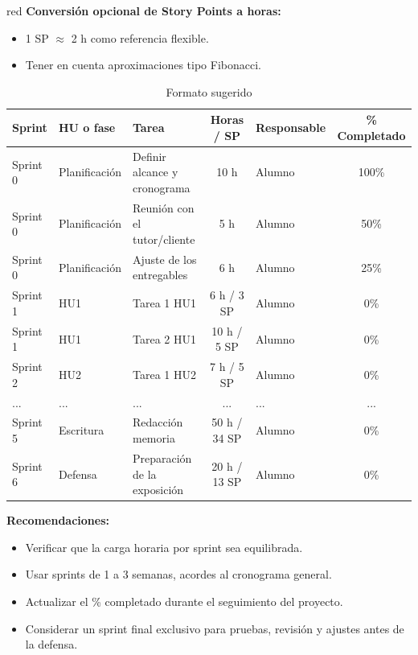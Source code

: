 \begin{consigna}{red}
\textbf{Conversión opcional de Story Points a horas:}
\begin{itemize}
  \item 1 SP \(\approx\) 2 h como referencia flexible.
  \item Tener en cuenta aproximaciones tipo Fibonacci.
\end{itemize}

\begin{table}[htpb]
\centering
\caption{Formato sugerido}
\begin{tabularx}{\linewidth}{@{}|l|l|X|c|l|c|@{}}
\hline
\rowcolor[HTML]{C0C0C0}
Sprint & HU o fase & Tarea & Horas / SP & Responsable & \% Completado \\ \hline
Sprint 0 & Planificación & Definir alcance y cronograma & 10 h & Alumno & 100\% \\ \hline
Sprint 0 & Planificación & Reunión con el tutor/cliente & 5 h & Alumno & 50\% \\ \hline
Sprint 0 & Planificación & Ajuste de los entregables & 6 h & Alumno & 25\% \\ \hline
Sprint 1 & HU1 & Tarea 1 HU1 & 6 h / 3 SP & Alumno & 0\% \\ \hline
Sprint 1 & HU1 & Tarea 2 HU1 & 10 h / 5 SP & Alumno & 0\% \\ \hline
Sprint 2 & HU2 & Tarea 1 HU2 & 7 h / 5 SP & Alumno & 0\% \\ \hline
... & ... & ... & ... & ... & ... \\ \hline
Sprint 5 & Escritura & Redacción memoria & 50 h / 34 SP & Alumno & 0\% \\ \hline
Sprint 6 & Defensa & Preparación de la exposición & 20 h / 13 SP & Alumno & 0\% \\ \hline
\end{tabularx}
\end{table}

\textbf{Recomendaciones:}
\begin{itemize}
  \item Verificar que la carga horaria por sprint sea equilibrada.
  \item Usar sprints de 1 a 3 semanas, acordes al cronograma general.
  \item Actualizar el \% completado durante el seguimiento del proyecto.
  \item Considerar un sprint final exclusivo para pruebas, revisión y ajustes antes de la defensa.
\end{itemize}
\end{consigna}
